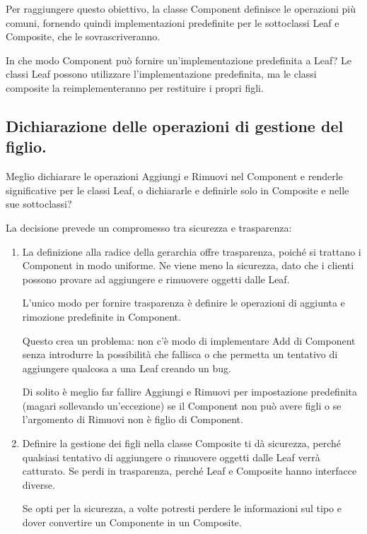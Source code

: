 Per raggiungere questo obiettivo, la classe Component definisce le operazioni più comuni, fornendo quindi implementazioni predefinite per le sottoclassi Leaf e Composite, che le sovrascriveranno.

In che modo Component può fornire un'implementazione predefinita a Leaf? Le classi Leaf possono utilizzare l'implementazione predefinita, ma le classi composite la reimplementeranno per restituire i propri figli.

\subsection{Dichiarazione delle operazioni di gestione del figlio.}
Meglio dichiarare le operazioni Aggiungi e Rimuovi nel Component e renderle significative per le classi Leaf, o dichiararle e definirle solo in Composite e nelle sue sottoclassi?

La decisione prevede un compromesso tra sicurezza e trasparenza:

\begin{enumerate}
    \item La definizione alla radice della gerarchia offre trasparenza, poiché si trattano i Component in modo uniforme. Ne viene meno la sicurezza, dato che i clienti possono provare ad aggiungere e rimuovere oggetti dalle Leaf.

    L'unico modo per fornire trasparenza è definire le operazioni di aggiunta e rimozione predefinite in Component. 

    Questo crea un problema: non c'è modo di implementare Add di Component senza introdurre la possibilità che fallisca o che permetta un tentativo di aggiungere qualcosa a una Leaf creando un bug.

    Di solito è meglio far fallire Aggiungi e Rimuovi per impostazione predefinita (magari sollevando un'eccezione) se il Component non può avere figli o se l'argomento di Rimuovi non è figlio di Component.

    \item Definire la gestione dei figli nella classe Composite ti dà sicurezza, perché qualsiasi tentativo di aggiungere o rimuovere oggetti dalle Leaf verrà catturato. Se perdi in trasparenza, perché Leaf e Composite hanno interfacce diverse.

    Se opti per la sicurezza, a volte potresti perdere le informazioni sul tipo e dover convertire un Componente in un Composite.
\end{enumerate}

